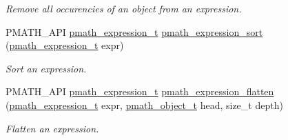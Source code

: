 \begin{CompactItemize}
\begin{CompactList}\small\item\em Remove all occurencies of an object from an expression. \item\end{CompactList}\item 
PMATH\_\-API \hyperlink{classpmath__expression__t}{pmath\_\-expression\_\-t} \hyperlink{group__expressions_g98e7293a37e8498df0a7f6171a1fc0f6}{pmath\_\-expression\_\-sort} (\hyperlink{classpmath__expression__t}{pmath\_\-expression\_\-t} expr)
\begin{CompactList}\small\item\em Sort an expression. \item\end{CompactList}\item 
PMATH\_\-API \hyperlink{classpmath__expression__t}{pmath\_\-expression\_\-t} \hyperlink{group__expressions_g03458ea9be906b9efc8bcb1d66d62c90}{pmath\_\-expression\_\-flatten} (\hyperlink{classpmath__expression__t}{pmath\_\-expression\_\-t} expr, \hyperlink{classpmath__object__t}{pmath\_\-object\_\-t} head, size\_\-t depth)
\begin{CompactList}\small\item\em Flatten an expression. \item\end{CompactList}\end{CompactItemize}
